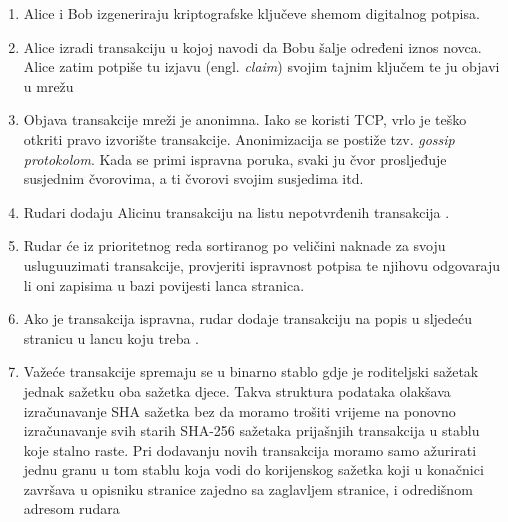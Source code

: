 \documentclass[utf8, zavrsni]{fer}
\begin{document}
\begin{enumerate}
	\item Alice i Bob izgeneriraju kriptografske ključeve shemom digitalnog potpisa.
	\item Alice izradi transakciju u kojoj navodi da Bobu šalje određeni iznos novca. Alice zatim potpiše tu izjavu (engl. \textit{claim}) svojim tajnim ključem te ju objavi u mrežu

	\item Objava transakcije mreži je anonimna. Iako se koristi TCP, vrlo je teško otkriti pravo izvorište transakcije. Anonimizacija se postiže tzv. \textit{gossip protokolom}. Kada se primi ispravna poruka, svaki ju čvor prosljeđuje susjednim čvorovima, a ti čvorovi svojim susjedima itd.
	\item Rudari dodaju Alicinu transakciju na listu nepotvrđenih transakcija \footnotemark.
	
	\item Rudar će iz prioritetnog reda sortiranog po veličini naknade za svoju uslugu\footnotemark uzimati transakcije, provjeriti ispravnost potpisa te njihovu odgovaraju li oni zapisima u bazi povijesti lanca stranica.
	
	\item Ako je transakcija ispravna, rudar dodaje transakciju na popis u sljedeću stranicu u lancu koju treba .
	\item Važeće transakcije spremaju se u binarno stablo gdje je roditeljski sažetak jednak sažetku oba sažetka djece\footnotemark. Takva struktura podataka olakšava izračunavanje SHA sažetka bez da moramo trošiti vrijeme na ponovno izračunavanje svih starih SHA-256 sažetaka prijašnjih transakcija u stablu koje stalno raste. Pri dodavanju novih transakcija moramo samo ažurirati jednu granu u tom stablu koja vodi do korijenskog sažetka koji u konačnici završava u opisniku stranice zajedno sa zaglavljem stranice, i odredišnom adresom rudara 
	

\end{enumerate}
\end{document}
